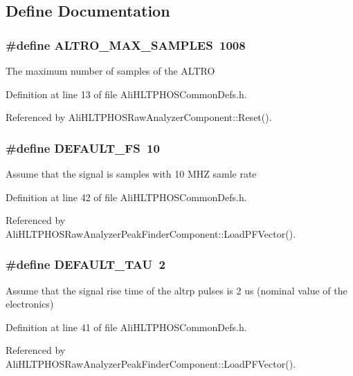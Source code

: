 \subsection{Define Documentation}
\subsubsection{\setlength{\rightskip}{0pt plus 5cm}\#define ALTRO\_\-MAX\_\-SAMPLES\ 1008}\label{AliHLTPHOSCommonDefs_8h_a8}


The maximum number of samples of the ALTRO 

Definition at line 13 of file Ali\-HLTPHOSCommon\-Defs.h.

Referenced by Ali\-HLTPHOSRaw\-Analyzer\-Component::Reset().
\subsubsection{\setlength{\rightskip}{0pt plus 5cm}\#define DEFAULT\_\-FS\ 10}\label{AliHLTPHOSCommonDefs_8h_a26}


Assume that the signal is samples with 10 MHZ samle rate 

Definition at line 42 of file Ali\-HLTPHOSCommon\-Defs.h.

Referenced by Ali\-HLTPHOSRaw\-Analyzer\-Peak\-Finder\-Component::Load\-PFVector().
\subsubsection{\setlength{\rightskip}{0pt plus 5cm}\#define DEFAULT\_\-TAU\ 2}\label{AliHLTPHOSCommonDefs_8h_a25}


Assume that the signal rise time of the altrp pulses is 2 us (nominal value of the electronics) 

Definition at line 41 of file Ali\-HLTPHOSCommon\-Defs.h.

Referenced by Ali\-HLTPHOSRaw\-Analyzer\-Peak\-Finder\-Component::Load\-PFVector().
